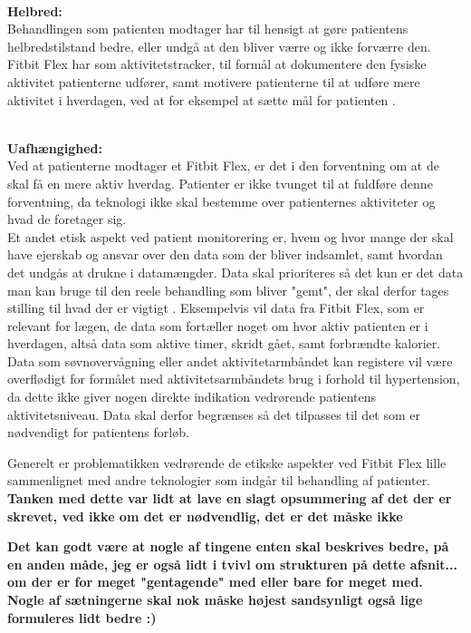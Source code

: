 \noindent \\
\textbf{Helbred:}
\noindent \\
Behandlingen som patienten modtager har til hensigt at gøre patientens helbredstilstand bedre, eller undgå at den bliver værre og ikke forværre den. Fitbit Flex har som aktivitetstracker, til formål at dokumentere den fysiske aktivitet patienterne udfører, samt motivere patienterne til at udføre mere aktivitet i hverdagen, ved at for eksempel at sætte mål for patienten \citep{Nordgren2013}. 

\noindent \\
\textbf{Uafhængighed:}
\noindent \\
Ved at patienterne modtager et Fitbit Flex, er det i den forventning om at de skal få en mere aktiv hverdag. Patienter er ikke tvunget til at fuldføre denne forventning, da teknologi ikke skal bestemme over patienternes aktiviteter og hvad de foretager sig. \citep{Nordgren2013}
\\

Et andet etisk aspekt ved patient monitorering er, hvem og hvor mange der skal have ejerskab og ansvar over den data som der bliver indsamlet, samt hvordan det undgås at drukne i datamængder. Data skal prioriteres så det kun er det data man kan bruge til den reele behandling som bliver "gemt", der skal derfor tages stilling til hvad der er vigtigt \citep{patienthome2015}. Eksempelvis vil data fra Fitbit Flex, som er relevant for lægen, de data som fortæller noget om hvor aktiv patienten er i hverdagen, altså data som aktive timer, skridt gået, samt forbrændte kalorier. Data som søvnovervågning eller andet aktivitetarmbåndet kan registere vil være overflødigt for formålet med aktivitetsarmbåndets brug i forhold til hypertension, da dette ikke giver nogen direkte indikation vedrørende patientens aktivitetsniveau. Data skal derfor begrænses så det tilpasses til det som er nødvendigt for patientens forløb. 

Generelt er problematikken vedrørende de etikske aspekter ved Fitbit Flex lille sammenlignet med andre teknologier som indgår til behandling af patienter. \textbf{Tanken med dette var lidt at lave en slagt opsummering af det der er skrevet, ved ikke om det er nødvendlig, det er det måske ikke}

\textbf{Det kan godt være at nogle af tingene enten skal beskrives bedre, på en anden måde, jeg er også lidt i tvivl om strukturen på dette afsnit... om der er for meget "gentagende" med eller bare for meget med. Nogle af sætningerne skal nok måske højest sandsynligt også lige formuleres lidt bedre :) }











